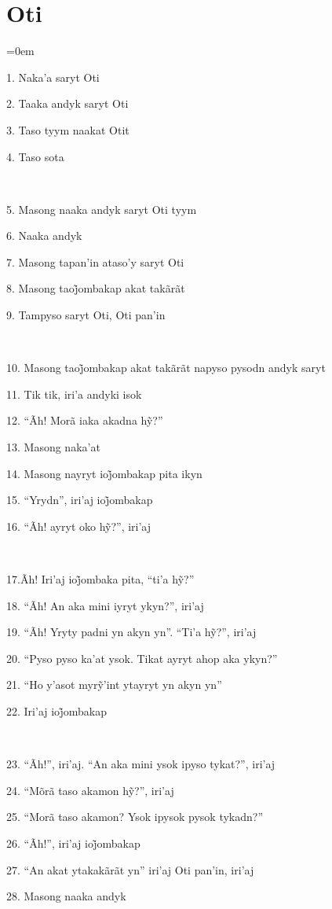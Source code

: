 \chapter*{Oti}\parindent=0em

1. Naka'a saryt Oti

2. Taaka andyk saryt Oti

3. Taso tyym naakat Otit

4. Taso sota

~

5. Masong naaka andyk saryt Oti tyym

6. Naaka andyk

7. Masong tapan'in ataso'y saryt Oti

8. Masong taoj̃ombakap akat takãrãt

9. Tampyso saryt Oti, Oti pan'in

~

10. Masong taoj̃ombakap akat takãrãt napyso pysodn andyk saryt

11. Tik tik, iri'a andyki isok

12. ``Ãh! Morã iaka akadna hỹ?''

13. Masong naka'at

14. Masong nayryt ioj̃ombakap pita ikyn

15. ``Yrydn'', iri’aj ioj̃ombakap

16. ``Ãh! ayryt oko hỹ?'', iri’aj

~

17.Ãh! Iri’aj ioj̃ombaka pita, ``ti’a hỹ?''

18. ``Ãh! An aka mini iyryt ykyn?'', iri'aj

19. ``Ãh! Yryty padni yn akyn yn''. ``Ti’a hỹ?'', iri’aj

20. ``Pyso pyso ka'at ysok. Tikat ayryt ahop aka ykyn?''

21. ``Ho y’asot myrỹ’int ytayryt yn akyn yn''

22. Iri’aj ioj̃ombakap

~

23. ``Ãh!'', iri'aj. ``An aka mini ysok ipyso tykat?'', iri'aj

24. ``Mõrã taso akamon hỹ?'', iri’aj

25. ``Morã taso akamon? Ysok ipysok pysok tykadn?''

26. ``Ãh!'', iri’aj ioj̃ombakap

27. ``An akat ytakakãrãt yn'' iri'aj Oti pan'in, iri'aj

28. Masong naaka andyk

~

